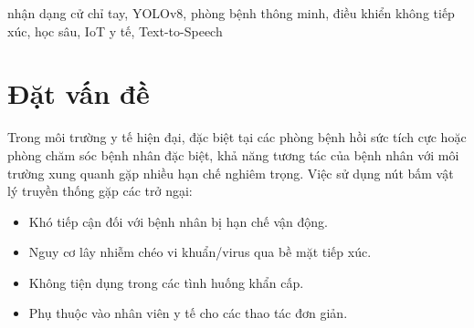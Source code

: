 \documentclass[conference]{IEEEtran}
\begin{document}
\maketitle

\begin{abstract}
Trong môi trường y tế hiện đại, việc hỗ trợ bệnh nhân tương tác với các thiết bị trong phòng bệnh mà không cần tiếp xúc vật lý là nhu cầu cấp thiết. Bài báo trình bày hệ thống nhận dạng cử chỉ tay thời gian thực sử dụng mô hình YOLOv8 Nano (Custom) để điều khiển thiết bị hỗ trợ chăm sóc bệnh nhân trong phòng bệnh thông minh. Hệ thống nhận dạng 6 cử chỉ tay: \textbf{Nắm tay} (bật/tắt đèn), \textbf{Chỉ ngón trỏ} (nâng/hạ giường), \textbf{Xòe tay} (SOS khẩn cấp), \textbf{Vuốt trái/phải} (kéo/mở rèm) và \textbf{Vẫy tay} (gọi bác sĩ). Bộ dữ liệu gồm \textbf{2.561 ảnh} (Tập huấn luyện: 2.049 ảnh, Tập Val: 512 ảnh) được gán nhãn và huấn luyện trên Google Colab với GPU Tesla T4. Mô hình đạt mAP@0.5 = \textbf{97,1\%}. Hệ thống tích hợp bộ lọc Dwell-time 5 giây chống kích hoạt nhầm, phản hồi bằng giọng nói tiếng Việt (TTS) và giao diện Dashboard web hoạt động 100\% offline.
\end{abstract}

\begin{IEEEkeywords}
nhận dạng cử chỉ tay, YOLOv8, phòng bệnh thông minh, điều khiển không tiếp xúc, học sâu, IoT y tế, Text-to-Speech
\end{IEEEkeywords}

\section{Đặt vấn đề}

Trong môi trường y tế hiện đại, đặc biệt tại các phòng bệnh hồi sức tích cực hoặc phòng chăm sóc bệnh nhân đặc biệt, khả năng tương tác của bệnh nhân với môi trường xung quanh gặp nhiều hạn chế nghiêm trọng. Việc sử dụng nút bấm vật lý truyền thống gặp các trở ngại:

\begin{itemize}[noitemsep]
    \item Khó tiếp cận đối với bệnh nhân bị hạn chế vận động.
    \item Nguy cơ lây nhiễm chéo vi khuẩn/virus qua bề mặt tiếp xúc.
    \item Không tiện dụng trong các tình huống khẩn cấp.
    \item Phụ thuộc vào nhân viên y tế cho các thao tác đơn giản.
\end{itemize}
\end{document}
